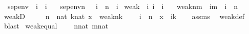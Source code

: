 \begin{isabellebody}
\isanewline
{}\isamarkupfalse%
\isanewline
\ \ sep{\isacharunderscore}{\kern0pt}env\ {\isacharcolon}{\kern0pt}{\isacharcolon}{\kern0pt}\ {\isachardoublequoteopen}i\ {\isasymRightarrow}\ i{\isachardoublequoteclose}\ \isanewline
\ \ {\isachardoublequoteopen}sep{\isacharunderscore}{\kern0pt}env{\isacharparenleft}{\kern0pt}n{\isacharparenright}{\kern0pt}\ {\isasymequiv}\ {\isasymlambda}\ i\ {\isasymin}\ {\isacharparenleft}{\kern0pt}{}{\isacharhash}{\kern0pt}{\isacharplus}{\kern0pt}n{\isacharparenright}{\kern0pt}{\isacharminus}{\kern0pt}{}\ {\isachardot}{\kern0pt}\ i{\isacharhash}{\kern0pt}{\isacharplus}{\kern0pt}{}{\isachardoublequoteclose}\isanewline
\isanewline
{}\isamarkupfalse%
\ weak\ {\isacharcolon}{\kern0pt}{\isacharcolon}{\kern0pt}\ {\isachardoublequoteopen}{\isacharbrackleft}{\kern0pt}i{\isacharcomma}{\kern0pt}\ i{\isacharbrackright}{\kern0pt}\ {\isasymRightarrow}\ i{\isachardoublequoteclose}\ \isanewline
\ \ {\isachardoublequoteopen}weak{\isacharparenleft}{\kern0pt}n{\isacharcomma}{\kern0pt}m{\isacharparenright}{\kern0pt}\ {\isasymequiv}\ {\isacharbraceleft}{\kern0pt}i{\isacharhash}{\kern0pt}{\isacharplus}{\kern0pt}m\ {\isachardot}{\kern0pt}\ i\ {\isasymin}\ n{\isacharbraceright}{\kern0pt}{\isachardoublequoteclose}\isanewline
\isanewline
{}\isamarkupfalse%
\ weakD\ {\isacharcolon}{\kern0pt}\ \isanewline
\ \ \ {\isachardoublequoteopen}n\ {\isasymin}\ nat{\isachardoublequoteclose}\ {\isachardoublequoteopen}k{\isasymin}nat{\isachardoublequoteclose}\ {\isachardoublequoteopen}x\ {\isasymin}\ weak{\isacharparenleft}{\kern0pt}n{\isacharcomma}{\kern0pt}k{\isacharparenright}{\kern0pt}{\isachardoublequoteclose}\isanewline
\ \ \ {\isachardoublequoteopen}{\isasymexists}\ i\ {\isasymin}\ n\ {\isachardot}{\kern0pt}\ x\ {\isacharequal}{\kern0pt}\ i{\isacharhash}{\kern0pt}{\isacharplus}{\kern0pt}k{\isachardoublequoteclose}\isanewline
%
\isadelimproof
\ \ %
\endisadelimproof
%
\isatagproof
{}\isamarkupfalse%
\ assms\ \isamarkupfalse%
\ weak{\isacharunderscore}{\kern0pt}def\ \isamarkupfalse%
\ blast%
\endisatagproof
{\isafoldproof}%
%
\isadelimproof
\isanewline
%
\endisadelimproof
\isanewline
{}\isamarkupfalse%
\ weak{\isacharunderscore}{\kern0pt}equal\ {\isacharcolon}{\kern0pt}\isanewline
\ \ \ {\isachardoublequoteopen}n{\isasymin}nat{\isachardoublequoteclose}\ {\isachardoublequoteopen}m{\isasymin}nat{\isachardoublequoteclose}\isanewline

\end{isabellebody}
